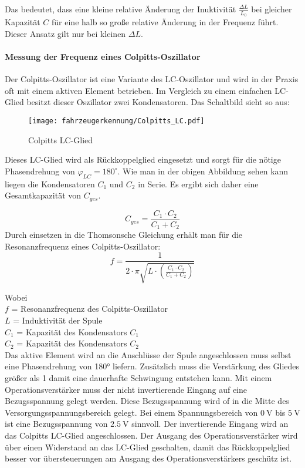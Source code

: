 Das bedeutet, dass eine kleine relative Änderung der Inuktivität $\frac{\Delta L}{L_{0}}$ bei gleicher Kapazität $C$ für eine halb so große relative Änderung in der Frequenz führt. 
Dieser Ansatz gilt nur bei kleinen $\Delta L$.

\paragraph{Messung der Frequenz eines Colpitts-Oszillator}\label{sec:colpitts}\mbox{}

Der Colpitts-Oszillator ist eine Variante des LC-Oszillator und wird in der Praxis oft mit einem aktiven Element betrieben. Im Vergleich zu einem einfachen LC-Glied besitzt dieser Oszillator
zwei Kondensatoren. Das Schaltbild sieht so aus:

\begin{figure}[H]
    \centering
    \texttt{[image: fahrzeugerkennung/Colpitts\_LC.pdf]}
    \caption{Colpitts LC-Glied}
\end{figure}

Dieses LC-Glied wird als Rückkoppelglied eingesetzt und sorgt für die nötige Phasendrehung von $\varphi_{LC} = 180^{\circ}$. Wie man in der obigen Abbildung sehen kann liegen die Kondensatoren 
$C_{1}$ und $C_{2}$ in Serie. Es ergibt sich daher eine Gesamtkapazität von $C_{ges}$.

\begin{equation} \label{eq:c_gescolpitts}
    C_{ges} = \frac{C_{1} \cdot C_{2}}{C_{1} + C_{2}}
\end{equation}
Durch einsetzen in die Thomsonsche Gleichung erhält man für die Resonanzfrequenz eines Colpitts-Oszillator:
\begin{equation} \label{eq:colpitts}
    f = \frac{1}{2 \cdot \pi \sqrt{L \cdot \left( \frac{C_{1} \cdot C_{2}}{C_{1} + C_{2}} \right) }}
\end{equation}

Wobei \\
$f$ = Resonanzfrequenz des Colpitts-Oszillator\\
$L$ = Induktivität der Spule\\
$C_{1}$ = Kapazität des Kondensators $C_{1}$\\
$C_{2}$ = Kapazität des Kondensators $C_{2}$\\

\pagebreak
Das aktive Element wird an die Anschlüsse der Spule angeschlossen muss selbst eine Phasendrehung von 180° liefern. Zusätzlich muss die Verstärkung des Gliedes größer als 1 damit eine dauerhafte 
Schwingung entstehen kann. Mit einem Operationsverstärker muss der nicht invertierende Eingang auf eine Bezugsspannung gelegt werden. Diese Bezugsspannung wird of in die Mitte des Versorgungsspannungsbereich
gelegt. Bei einem Spannungsbereich von $\SI{0}{\volt}$ bis $\SI{5}{\volt}$ ist eine Bezugsspannung von $\SI{2,5}{\volt}$ sinnvoll. Der invertierende Eingang wird an das Colpitts LC-Glied angeschlossen. Der Ausgang des Operationsverstärker wird über
einen Widerstand an das LC-Glied geschalten, damit das Rückkoppelglied besser vor übersteuerungen am Ausgang des Operationsverstärkers geschütz ist. 

